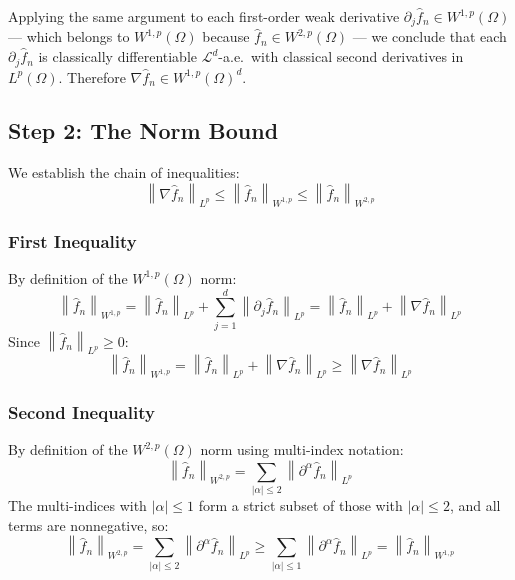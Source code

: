 \documentclass[12pt,a4paper]{article}
\numberwithin{equation}{section}
\theoremstyle{plain}
\theoremstyle{definition}
\newcommand{\norm}[1]{\left\| #1 \right\|}
\newcommand{\fn}{\hat{f}_n}
\begin{document}
	Applying the same argument to each first-order weak derivative $\partial_j \fn
	\in W^{1,p}(\Omega)$ — which belongs to $W^{1,p}(\Omega)$ because $\fn \in
	W^{2,p}(\Omega)$ — we conclude that each $\partial_j \fn$ is classically
	differentiable $\mathcal{L}^d$-a.e.\ with classical second derivatives in
	$L^p(\Omega)$. Therefore $\nabla \fn \in W^{1,p}(\Omega)^d$.
	
	\subsection{Step 2: The Norm Bound}
	
	We establish the chain of inequalities:
	\begin{equation}
		\norm{\nabla \fn}_{L^p}
		\leq \norm{\fn}_{W^{1,p}}
		\leq \norm{\fn}_{W^{2,p}}
	\end{equation}
	
	\subsubsection*{First Inequality}
	
	By definition of the $W^{1,p}(\Omega)$ norm:
	\begin{equation}
		\norm{\fn}_{W^{1,p}}
		= \norm{\fn}_{L^p} + \sum_{j=1}^d \norm{\partial_j \fn}_{L^p}
		= \norm{\fn}_{L^p} + \norm{\nabla \fn}_{L^p}
	\end{equation}
	Since $\norm{\fn}_{L^p} \geq 0$:
	\begin{equation}
		\norm{\fn}_{W^{1,p}}
		= \norm{\fn}_{L^p} + \norm{\nabla \fn}_{L^p}
		\geq \norm{\nabla \fn}_{L^p}
	\end{equation}
	
	\subsubsection*{Second Inequality}
	
	By definition of the $W^{2,p}(\Omega)$ norm using multi-index notation:
	\begin{equation}
		\norm{\fn}_{W^{2,p}}
		= \sum_{|\alpha| \leq 2} \norm{\partial^\alpha \fn}_{L^p}
	\end{equation}
	The multi-indices with $|\alpha| \leq 1$ form a strict subset of those with
	$|\alpha| \leq 2$, and all terms are nonneg­ative, so:
	\begin{equation}
		\norm{\fn}_{W^{2,p}}
		= \sum_{|\alpha| \leq 2} \norm{\partial^\alpha \fn}_{L^p}
		\geq \sum_{|\alpha| \leq 1} \norm{\partial^\alpha \fn}_{L^p}
		= \norm{\fn}_{W^{1,p}}
	\end{equation}
	
\end{document}
